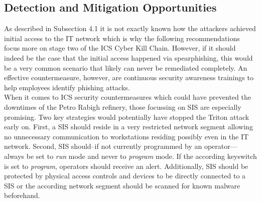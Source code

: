 \documentclass[runningheads]{llncs}
\begin{document}
\subsection{Detection and Mitigation Opportunities}
As described in Subsection 4.1 it is not exactly known how the attackers achieved initial access to the IT network which is why the following recommendations focus more on stage two of the ICS Cyber Kill Chain.
However, if it should indeed be the case that the initial access happened via spearphishing, this would be a very common scenario that likely can never be remediated completely.
An effective countermeasure, however, are continuous security awareness trainings to help employees identify phishing attacks.\\ %
When it comes to ICS security countermeasures which could have prevented the downtimes of the Petro Rabigh refinery, those focussing on SIS are especially promising.
Two key strategies would potentially have stopped the Triton attack early on.
First, a SIS should reside in a very restricted network segment allowing no unnecessary communication to workstations residing possibly even in the IT network.
Second, SIS should--if not currently programmed by an operator---always be set to \textit{run} mode and never to \textit{program} mode.
If the according keyswitch is set to \textit{program}, operators should receive an alert.
Additionally, SIS should be protected by physical access controls and devices to be directly connected to a SIS or the according network segment should be scanned for known malware beforehand. \cite{dragos.17}
\end{document}

